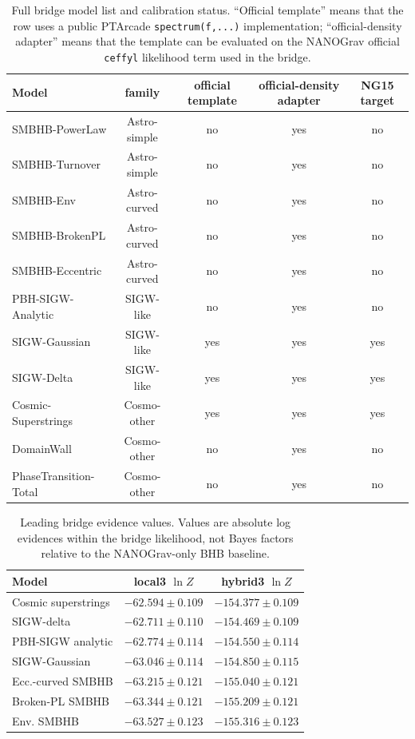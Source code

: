 \documentclass[aps,prl,superscriptaddress,nofootinbib]{revtex4-2}
\begin{document}
\begin{table}[H]
\caption{\label{tab:bridge-models}Full bridge model list and calibration
status.  ``Official template'' means that the row uses a public PTArcade
\texttt{spectrum(f,...)} implementation; ``official-density adapter'' means
that the template can be evaluated on the NANOGrav official
\texttt{ceffyl} likelihood term used in the bridge.}
\begin{ruledtabular}
\begin{tabular}{lcccc}
Model & family & official template & official-density adapter & NG15 target \\
\hline
SMBHB-PowerLaw & Astro-simple & no & yes & no \\
SMBHB-Turnover & Astro-simple & no & yes & no \\
SMBHB-Env & Astro-curved & no & yes & no \\
SMBHB-BrokenPL & Astro-curved & no & yes & no \\
SMBHB-Eccentric & Astro-curved & no & yes & no \\
PBH-SIGW-Analytic & SIGW-like & no & yes & no \\
SIGW-Gaussian & SIGW-like & yes & yes & yes \\
SIGW-Delta & SIGW-like & yes & yes & yes \\
Cosmic-Superstrings & Cosmo-other & yes & yes & yes \\
DomainWall & Cosmo-other & no & yes & no \\
PhaseTransition-Total & Cosmo-other & no & yes & no \\
\end{tabular}
\end{ruledtabular}
\end{table}

\begin{table}[H]
\caption{\label{tab:bridge}Leading bridge evidence values.  Values are absolute
log evidences within the bridge likelihood, not Bayes factors relative to the
NANOGrav-only BHB baseline.}
\begin{ruledtabular}
\begin{tabular}{lcc}
Model & local3 $\ln Z$ & hybrid3 $\ln Z$ \\
\hline
Cosmic superstrings & $-62.594\pm0.109$ & $-154.377\pm0.109$ \\
SIGW-delta & $-62.711\pm0.110$ & $-154.469\pm0.109$ \\
PBH-SIGW analytic & $-62.774\pm0.114$ & $-154.550\pm0.114$ \\
SIGW-Gaussian & $-63.046\pm0.114$ & $-154.850\pm0.115$ \\
Ecc.-curved SMBHB & $-63.215\pm0.121$ & $-155.040\pm0.121$ \\
Broken-PL SMBHB & $-63.344\pm0.121$ & $-155.209\pm0.121$ \\
Env. SMBHB & $-63.527\pm0.123$ & $-155.316\pm0.123$ \\
\end{tabular}
\end{ruledtabular}
\end{table}
\end{document}

